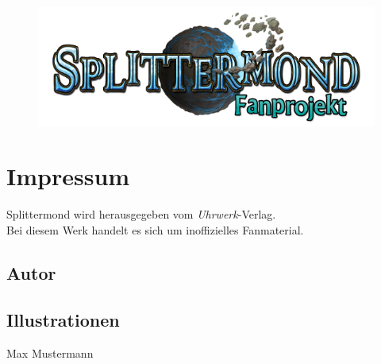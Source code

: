 \documentclass[12pt, a4paper, twoside, openany]{book}
\begin{document}
{%

        {%
            \begin{center}
                    \color{spmblue}
                    \fontsize{40}{50}
                    \selectfont
                    \textbf{\MyTitle}
            \end{center}
       }%
       \begin{figure}[t]
               \centering
               \includegraphics[scale=0.8]{bilder/Splittermond-Logo_fan_v2.png}
       \end{figure}
       
       \vfill
        \section*{Impressum}%
        \begin{center}
        Splittermond wird herausgegeben vom \textit{Uhrwerk}-Verlag.\\
        Bei diesem Werk handelt es sich um inoffizielles Fanmaterial.        
        \end{center}
        \subsection*{Autor}
        \begin{center} 
        \MyAuthor
        \end{center}
        \subsection*{Illustrationen}
        \begin{center}
        Max Mustermann        
        \end{center}

}
\end{document}
